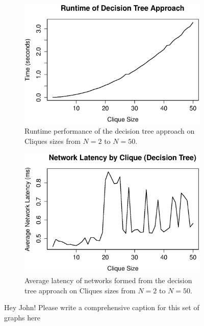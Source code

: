 \medskip
\begin{figure}[ht]
\begin{subfigure}{0.48\textwidth}
\includegraphics[width=\linewidth]{figures/decisiontree-runtime}
\caption{Runtime performance of the decision tree approach on Cliques sizes from $N=2$ to $N=50$.}
\label{fig:decisiontree-runtime}
\end{subfigure}\hspace*{\fill}
\begin{subfigure}{0.48\textwidth}
\includegraphics[width=\linewidth]{figures/decisiontree-latency}
\caption{Average latency of networks formed from the decision tree approach on Cliques sizes from $N=2$ to $N=50$.}
\label{fig:decisiontree-latency}
\end{subfigure}
\caption{ Hey John! Please write a comprehensive caption for this set of graphs here} \label{fig:1}
\end{figure}


